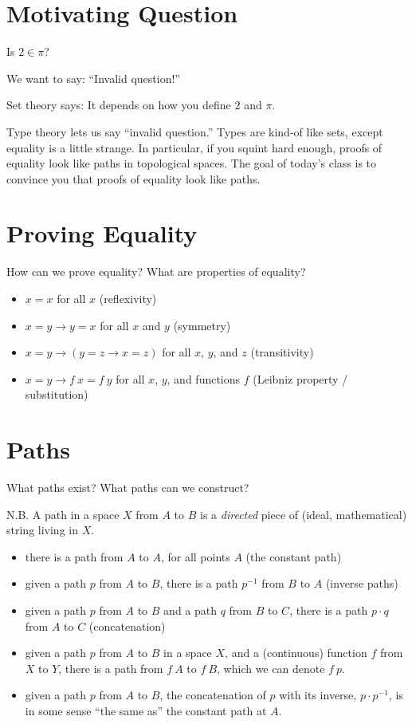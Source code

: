\documentclass{article}
\theoremstyle{definition}
\begin{document}
\section{Motivating Question}
  Is $2 \in \pi$?
  
  We want to say: ``Invalid question!''
  
  Set theory says: It depends on how you define $2$ and $\pi$.
  
  Type theory lets us say ``invalid question.''  Types are kind-of like sets, except equality is a little strange.  In particular, if you squint hard enough, proofs of equality look like paths in topological spaces.  The goal of today's class is to convince you that proofs of equality look like paths.

\section{Proving Equality}
How can we prove equality?  What are properties of equality?
\begin{itemize}
  \item $x = x$ for all $x$ (reflexivity)
  \item $x = y \to y = x$ for all $x$ and $y$ (symmetry)
  \item $x = y \to (y = z \to x = z)$ for all $x$, $y$, and $z$ (transitivity)
  \item $x = y \to f~x = f~y$ for all $x$, $y$, and functions $f$ (Leibniz property / substitution)
\end{itemize}

\section{Paths}
What paths exist?  What paths can we construct?

N.B. A path in a space $X$ from $A$ to $B$ is a \emph{directed} piece of (ideal, mathematical) string living in $X$.
\begin{itemize}
  \item there is a path from $A$ to $A$, for all points $A$ (the constant path)
  \item given a path $p$ from $A$ to $B$, there is a path $p^{-1}$ from $B$ to $A$ (inverse paths)
  \item given a path $p$ from $A$ to $B$ and a path $q$ from $B$ to $C$, there is a path $p \cdot q$ from $A$ to $C$ (concatenation)
  \item given a path $p$ from $A$ to $B$ in a space $X$, and a (continuous) function $f$ from $X$ to $Y$, there is a path from $f~A$ to $f~B$, which we can denote $f~p$.
  \item given a path $p$ from $A$ to $B$, the concatenation of $p$ with its inverse, $p \cdot p^{-1}$, is in some sense ``the same as'' the constant path at $A$.
\end{itemize}
\end{document}
